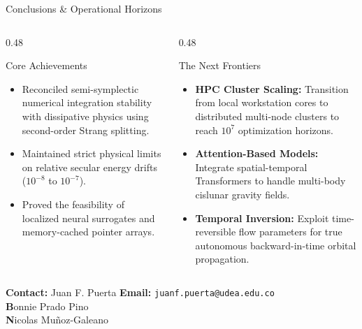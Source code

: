 \documentclass[presentation,10pt,aspectratio=169]{beamer}
\begin{document}
\begin{frame}{Conclusions \& Operational Horizons}
    \begin{columns}[T]
        \begin{column}{0.48\textwidth}
            \small
            \begin{block}{Core Achievements}
                \begin{itemize}
                    \item Reconciled semi-symplectic numerical integration stability with dissipative physics using second-order Strang splitting.
                    \item Maintained strict physical limits on relative secular energy drifts ($10^{-8}$ to $10^{-7}$).
                    \item Proved the feasibility of localized neural surrogates and memory-cached pointer arrays.
                \end{itemize}
            \end{block}
        \end{column}
        \begin{column}{0.48\textwidth}
            \small
            \begin{exampleblock}{The Next Frontiers}
                \begin{itemize}
                    \item \textbf{HPC Cluster Scaling:} Transition from local workstation cores to distributed multi-node clusters to reach $10^7$ optimization horizons.
                    \item \textbf{Attention-Based Models:} Integrate spatial-temporal Transformers to handle multi-body cislunar gravity fields.
                    \item \textbf{Temporal Inversion:} Exploit time-reversible flow parameters for true autonomous backward-in-time orbital propagation.
                \end{itemize}
            \end{exampleblock}
        \end{column}
    \end{columns}
    \vspace{0.3cm}
    \centering
    \footnotesize \textbf{Contact:} Juan F. Puerta \textbf{Email:} \texttt{juanf.puerta@udea.edu.co} \\
    \footnotesize \textbf Bonnie Prado Pino \\ 
    \footnotesize \textbf Nicolas Mu\~noz-Galeano
   
\end{frame}
\end{document}
